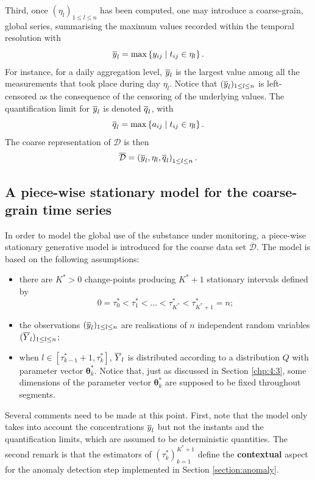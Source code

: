 Third, once $(\eta_l)_{1\leq l\leq n}$ has been computed,  one may introduce a coarse-grain, global series, summarising the maximum values recorded within the temporal resolution with
\begin{equation}
\overline{y}_l=\max\left\{y_{ij} \mid t_{ij}\in\eta_l\right\}.
\end{equation}
For instance, for a daily aggregation level, $\overline{y}_l$ is the largest value among all the measurements that took place during day $\eta_l$. Notice that $(\overline{y}_l)_{1\leq l\leq n}$ is left-censored as the consequence of the censoring of the underlying values. The quantification limit for $\overline{y}_l$ is denoted $\overline{q}_l$, with
\begin{equation}
\overline{q}_l=\max\left\{a_{ij}\mid t_{ij}\in\eta_l\right\}.   
\end{equation}
The coarse representation of $\mathcal{D}$ is then
\begin{equation}
\overline{\mathcal{D}}=\left(\overline{y}_l, \eta_l, \overline{q}_l\right)_{1\leq l\leq n}.
\end{equation}

\subsection{A piece-wise stationary model for the coarse-grain time series}\label{subsection:pwsm}

In order to model the global use of the substance under monitoring, a piece-wise stationary generative model is introduced for the coarse data set $\overline{\mathcal{D}}$. The model is based on the following assumptions:
\begin{itemize}
    \item there are $K^*>0$ change-points producing $K^*+1$ stationary intervals defined by
\begin{equation*}
0=\tau_0^*<\tau_1^*<\ldots<\tau_{K^*}^*<\tau^*_{K^*+1}=n;    
\end{equation*}    
    \item the observations $(\overline{y}_l)_{1\leq l\leq n}$ are realisations of $n$ independent random variables $(\overline{Y}_l)_{1\leq l\leq n}$;
    \item when $l\in [\tau^*_{k-1}+1, \tau^*_{k}]$, $\overline{Y}_l$ is distributed according to a distribution $Q$ with parameter vector $\bm\theta^*_k$. Notice that, just as discussed in Section \ref{chp:4:3}, some dimensions of the parameter vector $\bm\theta^*_k$ are supposed to be fixed throughout segments. 
\end{itemize}
Several comments need to be made at this point. First, note that the model only takes into account the concentrations $\overline{y}_l$ but not the instants and the quantification limits, which are assumed to be deterministic quantities. The second remark is that the estimators of $(\tau^*_k)_{k=1}^{K^*+1}$ define the \textbf{contextual} aspect for the anomaly detection step implemented in Section \ref{section:anomaly}. 

